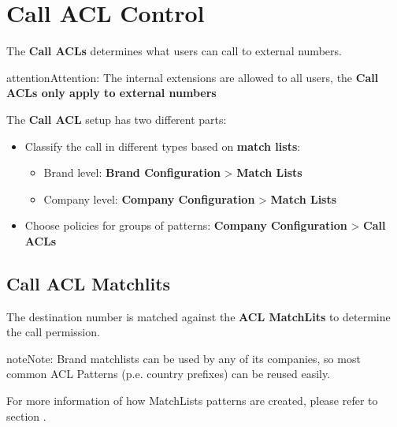 \documentclass[letterpaper,10pt,english]{sphinxmanual}
\begin{document}
\section{Call ACL Control}
\label{company/call_permissions:call-permissions}\label{company/call_permissions::doc}\label{company/call_permissions:call-acl-control}
The \textbf{Call ACLs} determines what users can call to external numbers.

\begin{notice}{attention}{Attention:}
The internal extensions are allowed to all users, the \textbf{Call
ACLs only apply to external numbers}
\end{notice}

The \textbf{Call ACL} setup has two different parts:
\begin{itemize}
\item {} 
Classify the call in different types based on \textbf{match lists}:
\begin{itemize}
\item {} 
Brand level: \textbf{Brand Configuration} \textgreater{} \textbf{Match Lists}

\item {} 
Company level: \textbf{Company Configuration} \textgreater{} \textbf{Match Lists}

\end{itemize}

\item {} 
Choose policies for groups of patterns: \textbf{Company Configuration} \textgreater{} \textbf{Call
ACLs}

\end{itemize}


\subsection{Call ACL Matchlits}
\label{company/call_permissions:call-acl-matchlits}
The destination number is matched against the \textbf{ACL MatchLits} to determine
the call permission.

\begin{notice}{note}{Note:}
Brand matchlists can be used by any of its companies, so most common
ACL Patterns (p.e. country prefixes) can be reused easily.
\end{notice}

For more information of how MatchLists patterns are created, please refer to section
{\hyperref[company/match_lists:match\string-lists]{}}.
\end{document}
